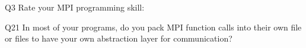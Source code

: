 \begin{description}%
\item{Q3} Rate your MPI programming skill:%
\item{Q21} In most of your programs, do you pack MPI function calls into their own file or files to have your own abstraction layer for communication?%
\end{description}%
